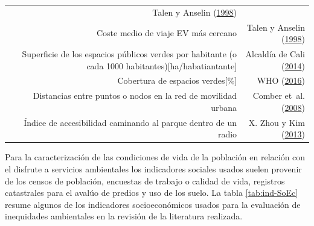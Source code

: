 \documentclass[12pt,a4paper,openany]{book}
\theoremstyle{definition}
\theoremstyle{definition}
\theoremstyle{definition}
\theoremstyle{remark}
\begin{document}
\begin{longtable}[]{@{}rr@{}}
\begin{minipage}[t]{0.31\columnwidth}
Talen y Anselin
(\protect\hyperlink{ref-talen_assessing_1998}{1998})\strut
\end{minipage}\tabularnewline
\begin{minipage}[t]{0.57\columnwidth}\raggedleft\strut
Coste medio de viaje EV más cercano\strut
\end{minipage} & \begin{minipage}[t]{0.31\columnwidth}\raggedleft\strut
Talen y Anselin
(\protect\hyperlink{ref-talen_assessing_1998}{1998})\strut
\end{minipage}\tabularnewline
\begin{minipage}[t]{0.57\columnwidth}\raggedleft\strut
Superficie de los espacios públicos verdes por habitante (o cada 1000
habitantes){[}ha/habatiantante{]}\strut
\end{minipage} & \begin{minipage}[t]{0.31\columnwidth}\raggedleft\strut
Alcaldía de Cali (\protect\hyperlink{ref-pot2014cali}{2014})\strut
\end{minipage}\tabularnewline
\begin{minipage}[t]{0.57\columnwidth}\raggedleft\strut
Cobertura de espacios verdes{[}\%{]}\strut
\end{minipage} & \begin{minipage}[t]{0.31\columnwidth}\raggedleft\strut
WHO (\protect\hyperlink{ref-who2016urban}{2016})\strut
\end{minipage}\tabularnewline
\begin{minipage}[t]{0.57\columnwidth}\raggedleft\strut
Distancias entre puntos o nodos en la red de movilidad urbana\strut
\end{minipage} & \begin{minipage}[t]{0.31\columnwidth}\raggedleft\strut
Comber et~al. (\protect\hyperlink{ref-comber_using_2008}{2008})\strut
\end{minipage}\tabularnewline
\begin{minipage}[t]{0.57\columnwidth}\raggedleft\strut
Índice de accesibilidad caminando al parque dentro de un radio\strut
\end{minipage} & \begin{minipage}[t]{0.31\columnwidth}\raggedleft\strut
X. Zhou y Kim (\protect\hyperlink{ref-zhou_social_2013}{2013})\strut
\end{minipage}\tabularnewline
\bottomrule
\end{longtable}

Para la caracterización de las condiciones de vida de la población en
relación con el disfrute a servicios ambientales los indicadores
sociales usados suelen provenir de los censos de población, encuestas de
trabajo o calidad de vida, registros catastrales para el avalúo de
predios y uso de los suelo. La tabla \ref{tab:ind-SoEc} resume algunos
de los indicadores socioeconómicos usados para la evaluación de
inequidades ambientales en la revisión de la literatura realizada.
\end{document}
